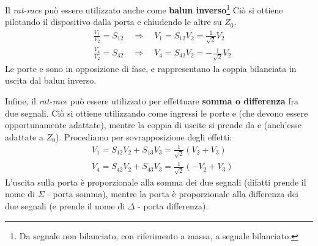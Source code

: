 	Il \textit{rat-race} può essere utilizzato anche come \textbf{balun inverso}\footnote{Da segnale non bilanciato, con riferimento a massa, a segnale bilanciato.} Ciò si ottiene pilotando il dispositivo dalla porta  e chiudendo le altre su $Z_0$.
	\begin{align*}
	&\frac{V_1}{V_2} = S_{12}
	\quad\Rightarrow\quad
	V_1 = S_{12} V_2 = \frac{1}{\sqrt{2}}V_2
	\\
	&\frac{V_4}{V_2} = S_{42}
	\quad\Rightarrow\quad
	V_4 = S_{42} V_2 = -\frac{1}{\sqrt{2}}V_2
	\end{align*}
	Le porte  e  sono in opposizione di fase, e rappresentano la coppia bilanciata in uscita dal balun inverso.
	
	Infine, il \textit{rat-race} può essere utilizzato per effettuare \textbf{somma o differenza} fra due segnali. Ciò si ottiene utilizzando  come ingressi le porte  e  (che devono essere opportunamente adattate), mentre la coppia di uscite si prende da  e  (anch'esse adattate a $Z_0$). Procediamo per sovrapposizione degli effetti:
	\begin{align*}
	&V_1 = S_{12} V_2 + S_{13}V_3 =
	\frac{1}{\sqrt{2}} (V_2 + V_3)
	\\
	&V_4 = S_{42} V_2 + S_{43}V_3 =
	\frac{1}{\sqrt{2}} (-V_2 + V_3)
	\end{align*}
	L'uscita sulla porta  è proporzionale alla somma dei due segnali (difatti prende il nome di $\Sigma$ - porta somma), mentre la porta  è proporzionale alla differenza dei due segnali (e prende il nome di $\Delta$ - porta differenza).
	
